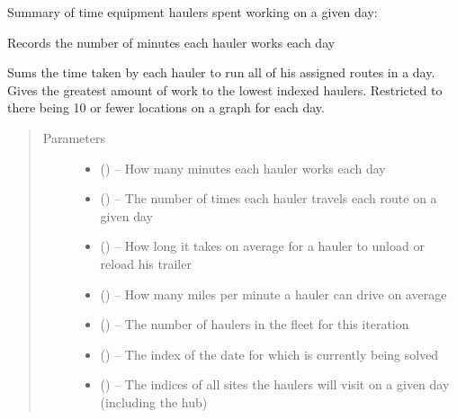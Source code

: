 \documentclass[letterpaper,10pt,english]{sphinxmanual}
\begin{document}
Summary of time equipment haulers spent working on a given day:

\begin{fulllineitems}
\label{\detokenize{daily-routing:recording.record_hauler_hours}}
Records the number of minutes each hauler works each day

Sums the time taken by each hauler to run all of his assigned routes in a
day. Gives the greatest amount of work to the lowest indexed haulers.
Restricted to there being 10 or fewer locations on a graph for each day.
\begin{quote}\begin{description}
\item[{Parameters}] \leavevmode\begin{itemize}
\item {} 
 () -- How many minutes each hauler works each day

\item {} 
 () -- The number of times each hauler travels each route on a given day

\item {} 
 () -- How long it takes on average for a hauler to unload or reload his trailer

\item {} 
 () -- How many miles per minute a hauler can drive on average

\item {} 
 () -- The number of haulers in the fleet for this iteration

\item {} 
 () -- The index of the date for which is currently being solved

\item {} 
 () -- The indices of all sites the haulers will visit on a given day (including
the hub)


\end{itemize}
\end{description}
\end{quote}
\end{fulllineitems}
\end{document}

